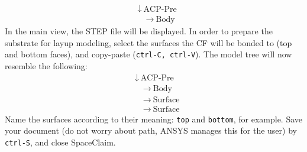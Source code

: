 \documentclass{amsdtx}
\begin{document}
\begin{align*}
	&\downarrow ~\text{ACP-Pre} \\
	&\quad\rightarrow~\text{Body}
\end{align*}
In the main view, the STEP file will be displayed. In order to prepare the substrate for layup modeling, select the surfaces the CF will be bonded to (top and bottom faces), and copy-paste (\verb|ctrl-C, ctrl-V|). The model tree will now resemble the following:
\begin{align*}
	&\downarrow ~\text{ACP-Pre} \\
	&\quad\rightarrow~\text{Body}\\
	&\quad\rightarrow~\text{Surface}\\
	&\quad\rightarrow~\text{Surface}
\end{align*}
Name the surfaces according to their meaning: \verb|top| and \verb|bottom|, for example. Save your document (do not worry about path, ANSYS manages this for the user) by \verb|ctrl-S|, and close SpaceClaim.\\
\newpage
\end{document}
